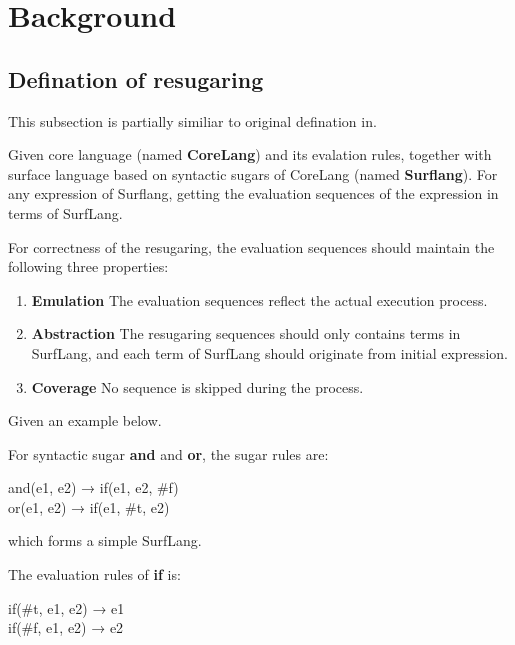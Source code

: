 \section{Background}
\label{sec:bg}

\subsection{Defination of resugaring}
This subsection is partially similiar to original defination in\cite{resugaring}.
\begin{Def}[Resugaring]
Given core language (named {\bfseries CoreLang}) and its evalation rules, together with surface language based on syntactic sugars of CoreLang (named {\bfseries Surflang}). For any expression of Surflang, getting the evaluation sequences of the expression in terms of SurfLang. 
\end{Def}
For correctness of the resugaring, the evaluation sequences should maintain the following three properties:
\begin{enumerate}
\item {\bfseries Emulation} The evaluation sequences reflect the actual execution process.
\item {\bfseries Abstraction} The resugaring sequences should only contains terms in SurfLang, and each term of SurfLang should originate from initial expression.
\item {\bfseries Coverage} No sequence is skipped during the process.
\end{enumerate}

Given an example below.

For syntactic sugar {\bfseries and} and {\bfseries or}, the sugar rules are:
\begin{center}
	\parbox[t]{\textwidth}{%
		\begin{center}  
			and(e1, e2) → if(e1, e2, \#f)\\
			or(e1, e2) → if(e1, \#t, e2)
		\end{center}  
	}%
\end{center}
which forms a simple SurfLang.

The evaluation rules of {\bfseries if} is:
\begin{center}
	\parbox[t]{\textwidth}{%
		\begin{center}  
			if(\#t, e1, e2) → e1\\
			if(\#f, e1, e2) → e2
		\end{center}  
	}%
\end{center}

